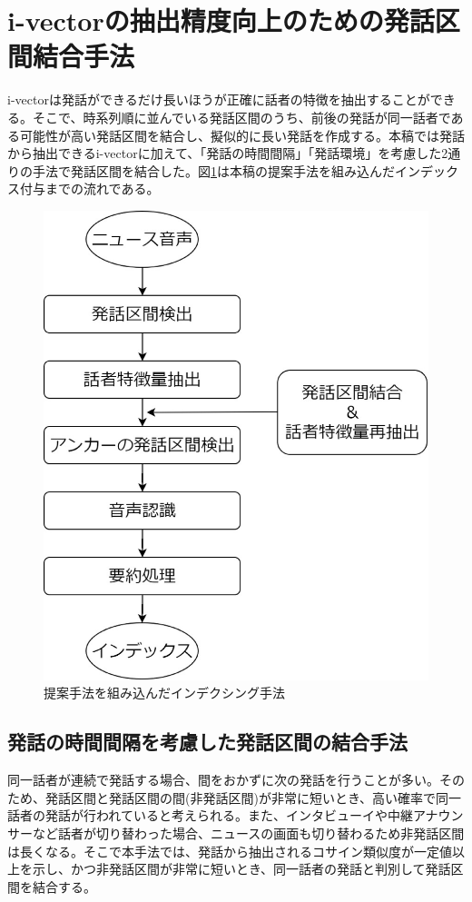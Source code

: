 \section{i-vectorの抽出精度向上のための発話区間結合手法}
\label{chapter:prob_method}
i-vectorは発話ができるだけ長いほうが正確に話者の特徴を抽出することができる。そこで、時系列順に並んでいる発話区間のうち、前後の発話が同一話者である可能性が高い発話区間を結合し、擬似的に長い発話を作成する。本稿では発話から抽出できるi-vectorに加えて、「発話の時間間隔」「発話環境」を考慮した2通りの手法で発話区間を結合した。図\ref{fig:indexing2}は本稿の提案手法を組み込んだインデックス付与までの流れである。

\begin{figure}[H]
  \begin{center}
    \includegraphics[scale=0.3]{./figure/indexing2.eps}
  \end{center}
  \caption{提案手法を組み込んだインデクシング手法 \label{fig:indexing2}}
\end{figure}

\subsection{発話の時間間隔を考慮した発話区間の結合手法}
\label{prob1}
同一話者が連続で発話する場合、間をおかずに次の発話を行うことが多い。そのため、発話区間と発話区間の間(非発話区間)が非常に短いとき、高い確率で同一話者の発話が行われていると考えられる。また、インタビューイや中継アナウンサーなど話者が切り替わった場合、ニュースの画面も切り替わるため非発話区間は長くなる。そこで本手法では、発話から抽出されるコサイン類似度が一定値以上を示し、かつ非発話区間が非常に短いとき、同一話者の発話と判別して発話区間を結合する。


